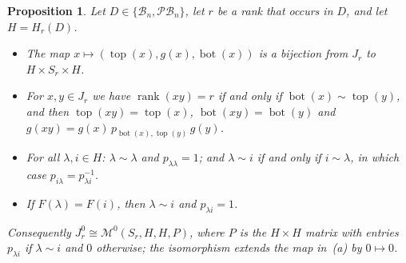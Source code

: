 \documentclass[11pt]{article}
\newtheorem{proposition}[theorem]{Proposition}
\theoremstyle{remark}
\newcommand{\B}{\mathcal B}
\newcommand{\PB}{\mathcal{PB}}
\newcommand{\M}{\mathcal M}
\newcommand{\tp}{\operatorname{top}}
\newcommand{\bt}{\operatorname{bot}}
\newcommand{\rk}{\operatorname{rank}}
\begin{document}
\begin{proposition}\label{prop:rees}
Let $D\in\{\B_n,\PB_n\}$, let $r$ be a rank that occurs in $D$, and let
$H=H_r(D)$.
\begin{itemize}
\item[(a)] The map $x\mapsto(\tp(x),g(x),\bt(x))$ is a bijection from $J_r$ to
 $H\times S_r\times H$.
\item[(b)] For $x,y\in J_r$ we have $\rk(xy)=r$ if and only if
 $\bt(x)\sim\tp(y)$, and then $\tp(xy)=\tp(x)$, $\bt(xy)=\bt(y)$ and
 $g(xy)=g(x)\,p_{\bt(x),\tp(y)}\,g(y)$.
\item[(c)] For all $\lambda,i\in H$: $\lambda\sim\lambda$ and
 $p_{\lambda\lambda}=1$; and $\lambda\sim i$ if and only if $i\sim\lambda$, in
 which case $p_{i\lambda}=p_{\lambda i}^{-1}$.
\item[(d)] If $F(\lambda)=F(i)$, then $\lambda\sim i$ and $p_{\lambda i}=1$.
\end{itemize}
Consequently $J_r^0\cong\M^0(S_r,H,H,P)$, where $P$ is the $H\times H$ matrix
with entries $p_{\lambda i}$ if $\lambda\sim i$ and $0$ otherwise; the
isomorphism extends the map in~(a) by $0\mapsto0$.
\end{proposition}
\end{document}
